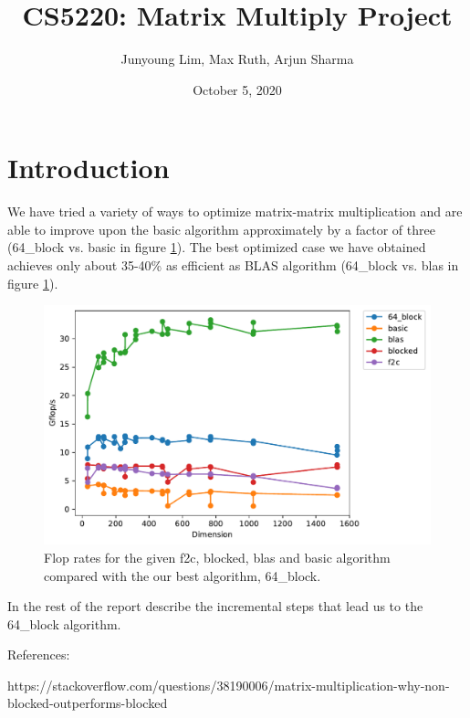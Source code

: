 \documentclass{article}
\title{CS5220: Matrix Multiply Project}
\author{Junyoung Lim, Max Ruth, Arjun Sharma}
\date{October 5, 2020}
\begin{document}
\maketitle

\section{Introduction}
We have tried a variety of ways to optimize matrix-matrix multiplication and are able to improve upon the basic algorithm approximately by a factor of three (64\_block vs. basic in figure \ref{fig:timing_methods}). The best optimized case we have obtained achieves only about 35-40\% as efficient as BLAS algorithm (64\_block vs. blas in figure \ref{fig:timing_methods}).

\begin{figure}[h!]
	\centering
	\includegraphics[width=0.8\columnwidth]{timing_methods.pdf}
	\caption{Flop rates for the given f2c, blocked, blas and basic algorithm compared with the our best algorithm, 64\_block.}
	\label{fig:timing_methods}
\end{figure}

In the rest of the report describe the incremental steps that lead us to the 64\_block algorithm. 

References: 

https://stackoverflow.com/questions/38190006/matrix-multiplication-why-non-blocked-outperforms-blocked
\end{document}
